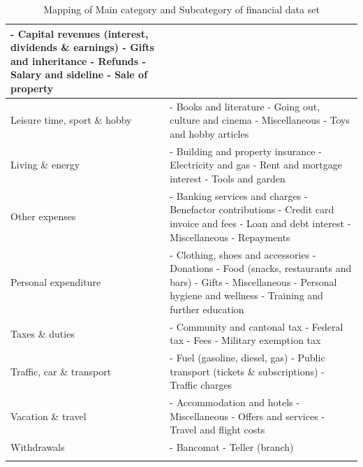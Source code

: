 \begin{longtable}{ | p{5cm} | p{9cm} |}
	- Capital revenues (interest, dividends \& earnings) \newline
	- Gifts and inheritance \newline
	- Refunds \newline
	- Salary and sideline \newline
	- Sale of property \\
	\hline
	Leisure time, sport \& hobby &
	- Books and literature \newline
	- Going out, culture and cinema \newline
	- Miscellaneous \newline
	- Toys and hobby articles \\
	\hline
	Living \& energy &
	- Building and property insurance \newline
	- Electricity and gas \newline
	- Rent and mortgage interest \newline
	- Tools and garden \\
	\hline
	Other expenses &
	- Banking services and charges \newline
	- Benefactor contributions \newline
	- Credit card invoice and fees \newline
	- Loan and debt interest \newline
	- Miscellaneous \newline
	- Repayments \\
	\hline
	Personal expenditure &
	- Clothing, shoes and accessories \newline
	- Donations \newline
	- Food (snacks, restaurants and bars) \newline
	- Gifts \newline
	- Miscellaneous \newline
	- Personal hygiene and wellness \newline
	- Training and further education \\
	\hline
	Taxes \& duties &
	- Community and cantonal tax \newline
	- Federal tax \newline
	- Fees \newline
	- Military exemption tax \\
	\hline
	Traffic, car \& transport &
	- Fuel (gasoline, diesel, gas) \newline
	- Public transport (tickets \& subscriptions) \newline
	- Traffic charges \\
	\hline
	Vacation \& travel &
	- Accommodation and hotels \newline
	- Miscellaneous \newline
	- Offers and services \newline
	- Travel and flight costs \\
	\hline
	Withdrawals &
	- Bancomat \newline
	- Teller (branch) \\
	\hline
	\caption{Mapping of Main category and Subcategory of financial data set}
	\label{tbl:financialcategories}
\end{longtable}

